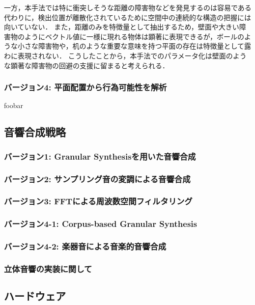 一方，本手法では特に衝突しそうな距離の障害物などを発見するのは容易である代わりに，検出位置が離散化されているために空間中の連続的な構造の把握には向いていない．
また，距離のみを特徴量として抽出するため，壁面や大きい障害物のようにベクトル値に一様に現れる物体は顕著に表現できるが，ボールのような小さな障害物や，机のような重要な意味を持つ平面の存在は特徴量として露わに表現されない．
こうしたことから，本手法でのパラメータ化は壁面のような顕著な障害物の回避の支援に留まると考えられる．

\newpage

\subsubsection{バージョン4: 平面配置から行為可能性を解析}

foobar

\subsection{音響合成戦略}

\subsubsection{バージョン1: Granular Synthesisを用いた音響合成}

\subsubsection{バージョン2: サンプリング音の変調による音響合成}

\subsubsection{バージョン3: FFTによる周波数空間フィルタリング}

\subsubsection{バージョン4-1: Corpus-based Granular Synthesis}

\subsubsection{バージョン4-2: 楽器音による音楽的音響合成}

\subsubsection{立体音響の実装に関して}

\subsection{ハードウェア}


